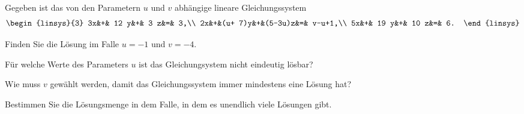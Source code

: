 Gegeben ist das von den Parametern $u$ und $v$ abhängige lineare
Gleichungssystem
\[
\begin{linsys}{3}
3x&+&   12 y&+& 3    z&=&     3,\\
2x&+&(u+ 7)y&+&(5-3u)z&=& v-u+1,\\
5x&+&   19 y&+& 10    z&=&    6.
\end{linsys}
\]
\begin{teilaufgaben}
\item
Finden Sie die Lösung im Falle $u=-1$ und $v=-4$.
\item
Für welche Werte des Parameters $u$ ist das Gleichungsystem nicht eindeutig
lösbar?
\item
Wie muss $v$ gewählt werden, damit das Gleichungssystem immer mindestens
eine Lösung hat?
\item
Bestimmen Sie die Lösungsmenge in dem Falle, in dem es unendlich viele
Lösungen gibt.
\end{teilaufgaben}

